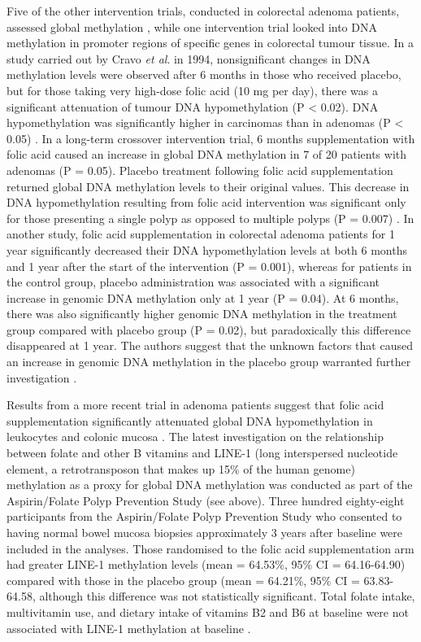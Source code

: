 \noindent Five of the other intervention trials, conducted in colorectal adenoma patients, assessed global methylation \cite{c253,c254,c255,c256,c257}, while one intervention trial looked into DNA methylation in promoter regions of specific genes \cite{c258} in colorectal tumour tissue. In a study carried out by Cravo \emph{et al}. in 1994, nonsignificant changes in DNA methylation levels were observed after 6 months in those who received placebo, but for those taking very high-dose folic acid (10 mg per day), there was a significant attenuation of tumour DNA hypomethylation (P < 0.02). DNA hypomethylation was significantly higher in carcinomas than in adenomas (P < 0.05) \cite{c253}. In a long-term crossover intervention trial, 6 months supplementation with folic acid caused an increase in global DNA methylation in 7 of 20 patients with adenomas (P = 0.05). Placebo treatment following folic acid supplementation returned global DNA methylation levels to their original values. This decrease in DNA 
hypomethylation resulting from folic acid intervention was significant only for those presenting a single polyp as opposed to multiple polyps (P = 0.007) \cite{c254}. In another study, folic acid supplementation in colorectal adenoma patients for 1 year significantly decreased their DNA hypomethylation levels at both 6 months and 1 year after the start of the intervention (P = 0.001), whereas for patients in the control group, placebo administration was associated with a significant increase in genomic DNA methylation only at 1 year (P = 0.04). At 6 months, there was also significantly higher genomic DNA methylation in the treatment group compared with placebo group (P = 0.02), but paradoxically this difference disappeared at 1 year. The authors suggest that the unknown factors that caused an increase in genomic DNA methylation in the placebo group warranted further investigation \cite{c255}. 
 
\noindent Results from a more recent trial in adenoma patients suggest that folic acid supplementation significantly attenuated global DNA hypomethylation in leukocytes and colonic mucosa \cite{c256}. The latest investigation on the relationship between folate and other B vitamins and LINE-1 (long interspersed nucleotide element, a retrotransposon that makes up 15\% of the human genome) methylation as a proxy for global DNA methylation was conducted as part of the Aspirin/Folate Polyp Prevention Study (see above). Three hundred eighty-eight participants from the Aspirin/Folate Polyp Prevention Study who consented to having normal bowel mucosa biopsies approximately 3 years after baseline were included in the analyses. Those randomised to the folic acid supplementation arm had greater LINE-1 methylation levels (mean = 64.53\%, 95\% CI = 64.16-64.90) compared with those in the placebo group (mean = 64.21\%, 95\% CI = 63.83-64.58, although this difference was not statistically significant. Total folate intake, 
multivitamin use, and dietary intake of vitamins B2 and B6 at baseline were not associated with LINE-1 methylation at baseline \cite{c257}. 

